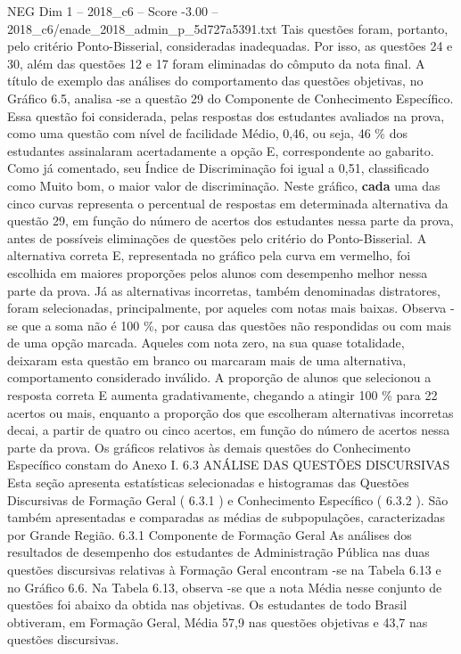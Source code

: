 \begin{textsample}{NEG Dim 1 – 2018\_c6 – Score -3.00 – 2018\_c6/enade\_2018\_admin\_p\_5d727a5391.txt}
Tais questões foram, portanto, pelo critério Ponto-Bisserial, consideradas inadequadas.
Por isso, as questões 24 e 30, além das questões 12 e 17 foram eliminadas do cômputo da nota final.
A título de exemplo das análises do comportamento das questões objetivas, no Gráfico 6.5, analisa -se a questão 29 do Componente de Conhecimento Específico.
Essa questão foi considerada, pelas respostas dos estudantes avaliados na prova, como uma questão com nível de facilidade Médio, 0,46, ou seja, 46 \% dos estudantes assinalaram acertadamente a opção E, correspondente ao gabarito.
Como já comentado, seu Índice de Discriminação foi igual a 0,51, classificado como Muito bom, o maior valor de discriminação.
Neste gráfico, \textbf{cada} uma das cinco curvas representa o percentual de respostas em determinada alternativa da questão 29, em função do número de acertos dos estudantes nessa parte da prova, antes de possíveis eliminações de questões pelo critério do Ponto-Bisserial.
A alternativa correta E, representada no gráfico pela curva em vermelho, foi escolhida em maiores proporções pelos alunos com desempenho melhor nessa parte da prova.
Já as alternativas incorretas, também denominadas distratores, foram selecionadas, principalmente, por aqueles com notas mais baixas.
Observa -se que a soma não é 100 \%, por causa das questões não respondidas ou com mais de uma opção marcada.
Aqueles com nota zero, na sua quase totalidade, deixaram esta questão em branco ou marcaram mais de uma alternativa, comportamento considerado inválido.
A proporção de alunos que selecionou a resposta correta E aumenta gradativamente, chegando a atingir 100 \% para 22 acertos ou mais, enquanto a proporção dos que escolheram alternativas incorretas decai, a partir de quatro ou cinco acertos, em função do número de acertos nessa parte da prova.
Os gráficos relativos às demais questões do Conhecimento Específico constam do Anexo I. 6.3 ANÁLISE DAS QUESTÕES DISCURSIVAS Esta seção apresenta estatísticas selecionadas e histogramas das Questões Discursivas de Formação Geral ( 6.3.1 ) e Conhecimento Específico ( 6.3.2 ).
São também apresentadas e comparadas as médias de subpopulações, caracterizadas por Grande Região. 6.3.1 Componente de Formação Geral As análises dos resultados de desempenho dos estudantes de Administração Pública nas duas questões discursivas relativas à Formação Geral encontram -se na Tabela 6.13 e no Gráfico 6.6.
Na Tabela 6.13, observa -se que a nota Média nesse conjunto de questões foi abaixo da obtida nas objetivas.
Os estudantes de todo Brasil obtiveram, em Formação Geral, Média 57,9 nas questões objetivas e 43,7 nas questões discursivas.

\end{textsample}
